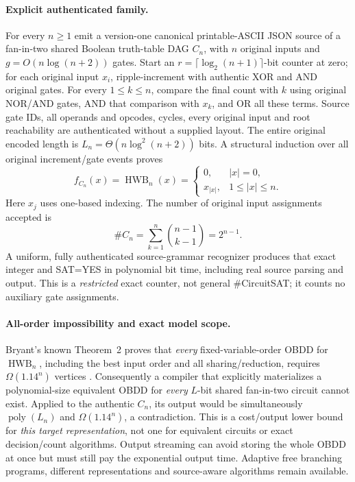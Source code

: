 \documentclass[11pt]{article}
\begin{document}
\paragraph{Explicit authenticated family.}
For every $n\ge1$ emit a version-one canonical printable-ASCII JSON
source of a fan-in-two shared Boolean truth-table DAG $C_n$, with
$n$ original inputs and $g=O(n\log(n+2))$ gates. Start an
$r=\lceil\log_2(n+1)\rceil$-bit counter at zero; for each original
input $x_i$, ripple-increment with authentic XOR and AND original gates.
For every $1\le k\le n$, compare the final count with $k$ using original
NOR/AND gates, AND that comparison with $x_k$, and OR all these terms.
Source gate IDs, all operands and opcodes, cycles, every original
input and root reachability are authenticated without a supplied layout.
The entire original encoded length is $L_n=\Theta(n\log^2(n+2))$ bits.
A structural induction over all original increment/gate events proves
\[
f_{C_n}(x)=\operatorname{HWB}_n(x)=
 \begin{cases}
 0,&|x|=0,\\
 x_{|x|},&1\le |x|\le n .
 \end{cases}
\]
Here $x_j$ uses one-based indexing. The number of original input assignments
accepted is
\[
\#C_n=\sum_{k=1}^n\binom{n-1}{k-1}=2^{n-1}.
\]
A uniform, fully authenticated source-grammar recognizer produces that
exact integer and SAT=YES in polynomial bit time, including real source
parsing and output. This is a \emph{restricted} exact counter, not general
\#CircuitSAT; it counts no auxiliary gate assignments.

\paragraph{All-order impossibility and exact model scope.}
Bryant's known Theorem~2 proves that \emph{every} fixed-variable-order
OBDD for $\operatorname{HWB}_n$, including the best input order and
all sharing/reduction, requires $\Omega(1.14^n)$ vertices
\cite{bryant1991}. Consequently a compiler that explicitly materializes
a polynomial-size equivalent OBDD for \emph{every} $L$-bit shared
fan-in-two circuit cannot exist. Applied to the authentic $C_n$, its
output would be simultaneously $\operatorname{poly}(L_n)$ and
$\Omega(1.14^n)$, a contradiction. This is a cost/output lower bound
for \emph{this target representation}, not one for equivalent circuits
or exact decision/count algorithms. Output streaming can avoid storing
the whole OBDD at once but must still pay the exponential output time.
Adaptive free branching programs, different representations and
source-aware algorithms remain available.
\end{document}
